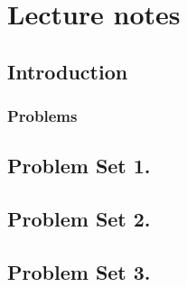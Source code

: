 %
%
\part{Lecture notes}
   \chapter{Introduction}
      
   
   
   
   
   
   
   
   
   
   
   
   
   
   
   
   \section{Problems}
      
      

   \chapter{Problem Set 1.}

      
      
      
      
      

   \chapter{Problem Set 2.}

      
      
      
      

   \chapter{Problem Set 3.}

